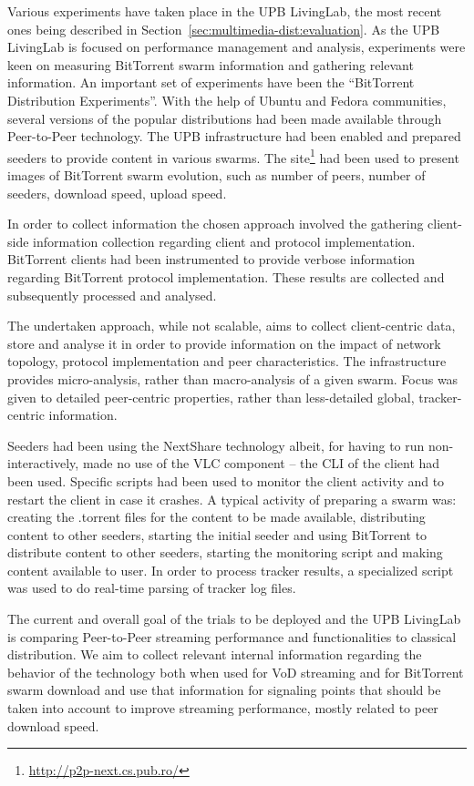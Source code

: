 Various experiments have taken place in the UPB LivingLab, the most recent
ones being described in Section~\ref{sec:multimedia-dist:evaluation}. As the
UPB LivingLab is focused on performance management and analysis, experiments
were keen on measuring BitTorrent swarm information and gathering relevant
information. An important set of experiments have been the ``BitTorrent
Distribution Experiments''. With the help of Ubuntu and Fedora communities,
several versions of the popular distributions had been made available through
Peer-to-Peer technology. The UPB infrastructure had been enabled and prepared
seeders to provide content in various swarms. The
site\footnote{\url{http://p2p-next.cs.pub.ro/}} had been used to present images of
BitTorrent swarm evolution, such as number of peers, number of seeders,
download speed, upload speed.

In order to collect information the chosen approach involved the gathering
client-side information collection regarding client and protocol
implementation. BitTorrent clients had been instrumented to provide verbose
information regarding BitTorrent protocol implementation. These results are
collected and subsequently processed and analysed.

The undertaken approach, while not scalable, aims to collect client-centric
data, store and analyse it in order to provide information on the impact of
network topology, protocol implementation and peer characteristics. The
infrastructure provides micro-analysis, rather than macro-analysis of a given
swarm. Focus was given to detailed peer-centric properties, rather than
less-detailed global, tracker-centric information.

Seeders had been using the NextShare technology albeit, for having to run
non-interactively, made no use of the VLC component -- the CLI of the
client had been used. Specific scripts had been used to monitor the client
activity and to restart the client in case it crashes. A typical activity of
preparing a swarm was: creating the .torrent files for the content to be made
available, distributing content to other seeders, starting the initial seeder
and using BitTorrent to distribute content to other seeders, starting the
monitoring script and making content available to user. In order to process
tracker results, a specialized script was used to do real-time parsing of
tracker log files.

The current and overall goal of the trials to be deployed and the UPB
LivingLab is comparing Peer-to-Peer streaming performance and functionalities
to classical distribution. We aim to collect relevant internal information
regarding the behavior of the technology both when used for VoD streaming and
for BitTorrent swarm download and use that information for signaling points
that should be taken into account to improve streaming performance, mostly
related to peer download speed.


